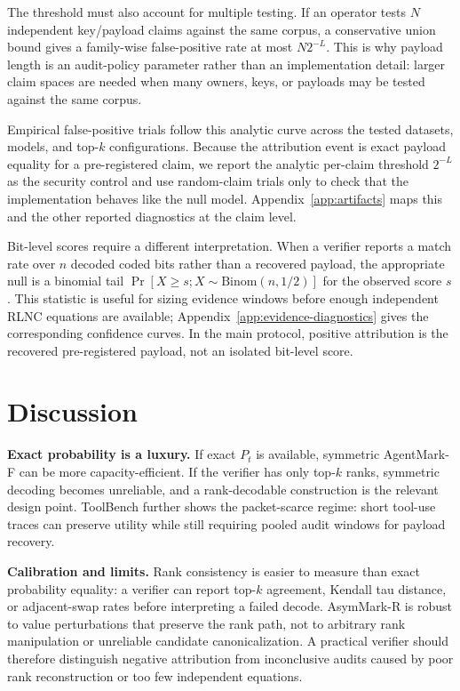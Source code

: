 \documentclass[conference,compsoc]{IEEEtran}
\newcommand{\ours}{AsymMark-R}
\newcommand{\agentmark}{AgentMark-F}
\begin{document}
The threshold must also account for multiple testing. If an operator tests $N$ independent key/payload claims against the same corpus, a conservative union bound gives a family-wise false-positive rate at most $N2^{-L}$. This is why payload length is an audit-policy parameter rather than an implementation detail: larger claim spaces are needed when many owners, keys, or payloads may be tested against the same corpus.

Empirical false-positive trials follow this analytic curve across the tested datasets, models, and top-$k$ configurations. Because the attribution event is exact payload equality for a pre-registered claim, we report the analytic per-claim threshold $2^{-L}$ as the security control and use random-claim trials only to check that the implementation behaves like the null model. Appendix~\ref{app:artifacts} maps this and the other reported diagnostics at the claim level.

Bit-level scores require a different interpretation. When a verifier reports a match rate over $n$ decoded coded bits rather than a recovered payload, the appropriate null is a binomial tail $\Pr[X\geq s; X\sim\mathrm{Binom}(n,1/2)]$ for the observed score $s$. This statistic is useful for sizing evidence windows before enough independent RLNC equations are available; Appendix~\ref{app:evidence-diagnostics} gives the corresponding confidence curves. In the main protocol, positive attribution is the recovered pre-registered payload, not an isolated bit-level score.

\section{Discussion}
\label{sec:discussion}

\textbf{Exact probability is a luxury.}
If exact $P_t$ is available, symmetric \agentmark{} can be more capacity-efficient. If the verifier has only top-$k$ ranks, symmetric decoding becomes unreliable, and a rank-decodable construction is the relevant design point. ToolBench further shows the packet-scarce regime: short tool-use traces can preserve utility while still requiring pooled audit windows for payload recovery.

\textbf{Calibration and limits.}
Rank consistency is easier to measure than exact probability equality: a verifier can report top-$k$ agreement, Kendall tau distance, or adjacent-swap rates before interpreting a failed decode. \ours{} is robust to value perturbations that preserve the rank path, not to arbitrary rank manipulation or unreliable candidate canonicalization. A practical verifier should therefore distinguish negative attribution from inconclusive audits caused by poor rank reconstruction or too few independent equations.
\end{document}
